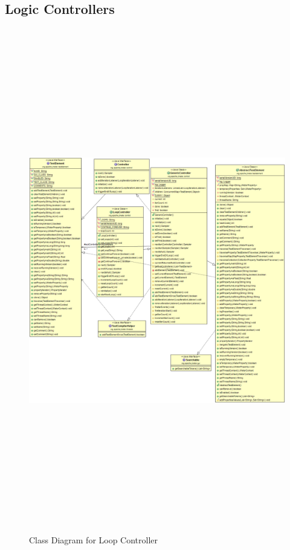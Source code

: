 \documentclass[12pt]{book}
\begin{document}
  \subsection{Logic Controllers}    
  \begin{figure}[H]
   \centering
   \includegraphics[width=17cm, height=22cm]{images/controller_loop}
   \caption{Class Diagram for Loop Controller\label{fig:fig6_JMeter}}
  \end{figure}
  
\end{document}
